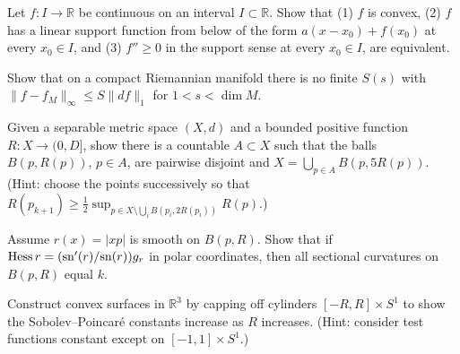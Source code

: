 \begin{remark}
  \label{rem:pet-ch7-ex-3}
  Let $f:I\to\mathbb{R}$ be continuous on an interval $I\subset\mathbb{R}$. Show that (1)
  $f$ is convex, (2) $f$ has a linear support function from below of the form
  $a(x-x_0)+f(x_0)$ at every $x_0\in I$, and (3) $f''\ge0$ in the support
  sense at every $x_0\in I$, are equivalent.
\end{remark}

\begin{remark}
  \label{rem:pet-ch7-ex-4}
  Show that on a compact Riemannian manifold there is no finite $S(s)$ with
  $\|f-f_M\|_\infty\le S\|df\|_1$ for $1<s<\dim M$.
\end{remark}

\begin{remark}
  \label{rem:pet-ch7-ex-5}
  Given a separable metric space $(X,d)$ and a bounded positive function
  $R:X\to(0,D]$, show there is a countable $A\subset X$ such that the balls
  $B(p,R(p))$, $p\in A$, are pairwise disjoint and $X=\bigcup_{p\in
  A}B(p,5R(p))$. (Hint: choose the points successively so that
  $R(p_{k+1})\ge\tfrac12\sup_{p\in X\setminus\bigcup_iB(p_i,2R(p_i))}R(p)$.)
\end{remark}

\begin{remark}
  \label{rem:pet-ch7-ex-6}
  Assume $r(x)=|xp|$ is smooth on $B(p,R)$. Show that if
  $\operatorname{Hess} r=(\mathrm{sn}'(r)/\mathrm{sn}(r))g_r$ in polar coordinates, then all sectional
  curvatures on $B(p,R)$ equal $k$.
\end{remark}

\begin{remark}
  \label{rem:pet-ch7-ex-7}
  Construct convex surfaces in $\mathbb{R}^3$ by capping off cylinders
  $[-R,R]\times S^1$ to show the Sobolev--Poincaré constants increase as $R$
  increases. (Hint: consider test functions constant except on $[-1,1]\times
  S^1$.)
\end{remark}

